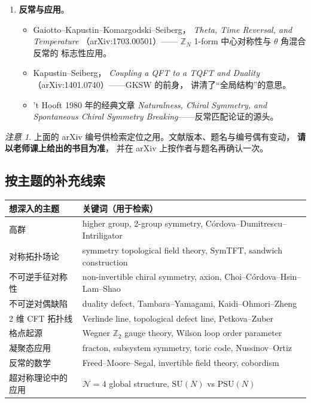 \documentclass[UTF8,a4paper,11pt]{ctexart}
\theoremstyle{plain}
\theoremstyle{definition}
\theoremstyle{remark}
\newtheorem{warning}{注意}[section]
\newcommand{\ZZ}{\mathbb{Z}}
\newcommand{\SUgrp}{\mathrm{SU}}
\begin{document}
\begin{enumerate}[label=\textbf{阶段 \arabic*：},leftmargin=1.9cm]
\begin{itemize}
        \end{itemize}
  \item \textbf{反常与应用}。
        \begin{itemize}
          \item Gaiotto--Kapustin--Komargodski--Seiberg，
                \emph{Theta, Time Reversal, and Temperature}
                （arXiv:1703.00501）——
                $\ZZ_N$ 1-form 中心对称性与 $\theta$ 角混合反常的
                标志性应用。
          \item Kapustin--Seiberg，
                \emph{Coupling a QFT to a TQFT and Duality}
                （arXiv:1401.0740）——GKSW 的前身，
                讲清了“全局结构”的意思。
          \item 't Hooft 1980 年的经典文章
                \emph{Naturalness, Chiral Symmetry, and Spontaneous
                Chiral Symmetry Breaking}——反常匹配论证的源头。
        \end{itemize}
\end{enumerate}

\begin{warning}
上面的 arXiv 编号供检索定位之用。文献版本、题名与编号偶有变动，
\textbf{请以老师课上给出的书目为准}，
并在 arXiv 上按作者与题名再确认一次。
\end{warning}

\subsection{按主题的补充线索}

\begin{center}
\begin{tabular}{@{}ll@{}}
\toprule
想深入的主题 & 关键词（用于检索） \\
\midrule
高群 & higher group, 2-group symmetry, Córdova--Dumitrescu--Intriligator \\
对称拓扑场论 & symmetry topological field theory, SymTFT, sandwich construction \\
不可逆手征对称性 & non-invertible chiral symmetry, axion, Choi--Córdova--Hsin--Lam--Shao \\
不可逆对偶缺陷 & duality defect, Tambara--Yamagami, Kaidi--Ohmori--Zheng \\
2 维 CFT 拓扑线 & Verlinde line, topological defect line, Petkova--Zuber \\
格点起源 & Wegner $\ZZ_2$ gauge theory, Wilson loop order parameter \\
凝聚态应用 & fracton, subsystem symmetry, toric code, Nussinov--Ortiz \\
反常的数学 & Freed--Moore--Segal, invertible field theory, cobordism \\
超对称理论中的应用 & $\mathcal N=4$ global structure, $\SUgrp(N)$ vs $\mathrm{PSU}(N)$ \\
\bottomrule
\end{tabular}
\end{center}
\end{document}
